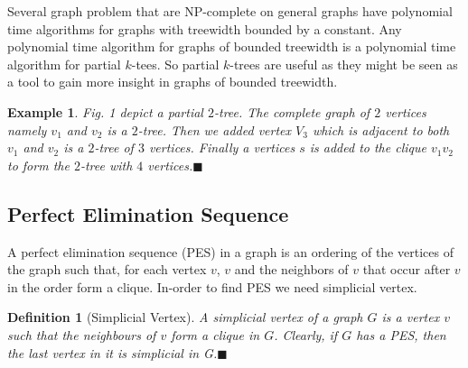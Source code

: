 \documentclass[12pt]{article}
\newtheorem{lemma}[theorem]{Lemma}
\newtheorem*{defi}{Definition}
\newtheorem{exmp}{Example}[section]
\begin{document}
   Several graph problem that are NP-complete on general graphs have polynomial time algorithms for graphs with treewidth bounded by a constant. Any polynomial time algorithm for graphs of bounded treewidth is a polynomial time algorithm for partial \(k\)-tees. So partial \(k\)-trees are useful as they might be seen as a tool to gain more insight in graphs of bounded treewidth.

  \begin{exmp}
  \normalfont
  Fig. 1 depict a partial $2$-tree. The complete graph of $2$ vertices namely $v_1$ and $v_2$ is a $2$-tree. Then we added vertex $V_3$ which is adjacent to both $v_1$ and $v_2$ is a $2$-tree of $3$ vertices. Finally a vertices $s$ is added to the clique $v_1v_2$ to form the $2$-tree with $4$ vertices.$\blacksquare$
  \end{exmp}
\subsection{Perfect Elimination Sequence}
A perfect elimination sequence (PES) in a graph is an ordering of the vertices of the graph such that, for each vertex $v$, $v$ and the neighbors of $v$ that occur after $v$ in the order form a clique. In-order to find PES we need simplicial vertex.
\begin{defi}[Simplicial Vertex]
\normalfont
A simplicial vertex of a graph $G$ is a vertex $v$ such that the neighbours of $v$ form a clique in $G$. Clearly, if $G$ has a PES, then the last vertex in it is simplicial in G.$\blacksquare$
\end{defi}

\end{document}
